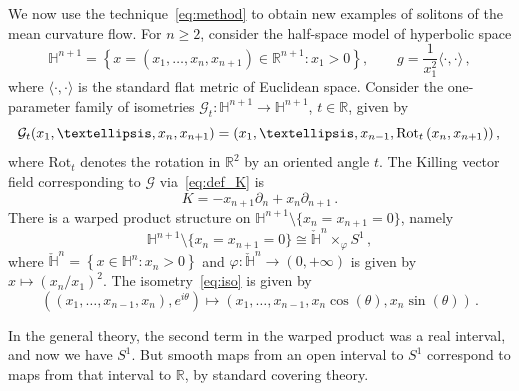 \documentclass[oneside,12pt]{amsart}
\theoremstyle{definition}
\newcommand{\R}{\mathbb{R}}
\renewcommand{\H}[1]{\mathbb{H}^{#1}}
\begin{document}
We now use the technique~\eqref{eq:method} to obtain new examples of solitons of the mean curvature flow. For $n \geq 2$, consider the half-space model of hyperbolic space
    \[\H{n+1}=\left\{ x=(x_1,\ldots,x_{n} , x_{n+1})\in\R^{n+1} : x_1>0\right\}, \qquad g=\frac{1}{x_1^2}\langle \cdot , \cdot \rangle \, ,
    \]
    where $\langle \cdot , \cdot \rangle$ is the standard flat metric of Euclidean space. Consider the one-parameter family of isometries $\mathcal{G}_t:\mathbb{H}^{n+1}\to\mathbb{H}^{n+1}$, $t\in\mathbb{R}$, given by
    \begin{equation*}
        \mathcal{G}_{t} (x_1 , \dots , x_{n} , x_{n+1}) = (x_1 , \dots , x_{n-1} , \mathrm{Rot}_{t} \left(x_{n} , x_{n+1} \right)) \, , \\
    \end{equation*}
    where $\mathrm{Rot}_t$ denotes the rotation in $\R^2$ by an oriented angle $t$. The Killing vector field corresponding to $ \mathcal{G}$ via~\eqref{eq:def_K} is 
    $$K=-x_{n+1}\partial_n+x_{n}\partial_{n+1} \, . $$
    There is a warped product structure on $\mathbb{H}^{n+1} \setminus \{x_n = x_{n+1} = 0 \}$, namely 
    \begin{equation} \label{eq:iso}
       \mathbb{H}^{n+1} \setminus \{x_n = x_{n+1} = 0 \} \cong \check{\mathbb{H}}^n \times_{\varphi} S^1 \, ,
    \end{equation}
    where $\check{\mathbb{H}}^n = \left\{ x \in \mathbb{H}^n \colon x_{n} > 0 \right\}$ and $\varphi \colon \check{\mathbb{H}}^n \to (0,+\infty)$ is given by $x \mapsto \left( x_n / x_1 \right)^2$. The isometry~\eqref{eq:iso} is given by
    \begin{equation*}
    \left( (x_1, \dots, x_{n-1}, x_n), e^{i \theta} \right) \mapsto (x_1, \dots, x_{n-1}, x_n \cos(\theta), x_n \sin(\theta)) \, .
    \end{equation*}

    In the general theory, the second term in the warped product was a real interval, and now we have $S^1$. But smooth maps from an open interval to $S^1$ correspond to maps from that interval to $\R$, by standard covering theory.
\end{document}
